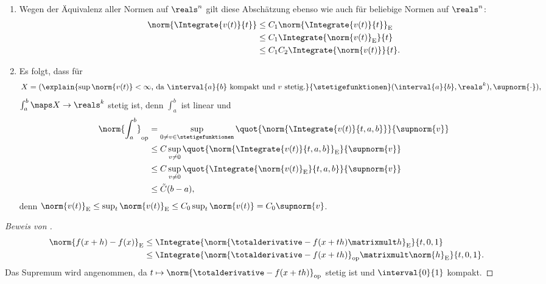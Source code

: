 \begin{bemerkungen*}
    \begin{enumerate}
        \item Wegen der Äquivalenz aller Normen auf \( \reals^n \) gilt diese Abschätzung ebenso wie  auch für beliebige Normen auf \( \reals^n \):
        \begin{equation*}
            \begin{split}
                \norm{\Integrate{v(t)}{t}}&\leq C_1\norm{\Integrate{v(t)}{t}}_{\text{E}}\\
                &\leq C_1\Integrate{\norm{v(t)}_{\text{E}}}{t}\\
                &\leq C_1 C_2 \Integrate{\norm{v(t)}}{t}.
            \end{split}
        \end{equation*}
        \item Es folgt, dass für
        \begin{equation*}
            X=(\explain{\sup\norm{v(t)}<\infty \text{, da \( \interval{a}{b} \) kompakt und \( v \) stetig.}}{\stetigefunktionen}(\interval{a}{b},\reals^k),\supnorm{\cdot}),
        \end{equation*}
        \( \int_a^b\maps X\to \reals^k \) stetig ist, denn \( \int_a^b \) ist linear und
        \begin{equation*}
            \begin{split}
                \norm{\int_a^b}_{\text{op}}&=\sup_{0\neq v \in \stetigefunktionen}\quot{\norm{\Integrate{v(t)}{t,a,b}}}{\supnorm{v}}\\
                &\leq C\sup_{v\neq 0}\quot{\norm{\Integrate{v(t)}{t,a,b}}_{\text{E}}}{\supnorm{v}}\\
                &\leq C\sup_{v\neq 0}\quot{\Integrate{\norm{v(t)}_{\text{E}}}{t,a,b}}{\supnorm{v}}\\
                &\leq \tilde{C}(b-a),
            \end{split}
        \end{equation*}
        denn \( \norm{v(t)}_{\text{E}}\leq \sup_{t}\norm{v(t)}_\text{E}\leq C_0\sup_t\norm{v(t)}=C_0\supnorm{v} \).
    \end{enumerate}
\end{bemerkungen*}
\begin{proof}[Beweis von ]
    \begin{equation*}
        \begin{split}
            \norm{f(x+h)-f(x)}_{\text{E}}&\leq \Integrate{\norm{\totalderivative-{f}(x+th)\matrixmult h}_{\text{E}}}{t,0,1}\\
            &\leq \Integrate{\norm{\totalderivative-{f}(x+th)}_{\text{op}}\matrixmult \norm{h}_{\text{E}}}{t,0,1}.
        \end{split}
    \end{equation*}
    Das Supremum wird angenommen, da \( t\mapsto \norm{\totalderivative-{f}(x+th)}_{\text{op}} \) stetig ist und \( \interval{0}{1} \) kompakt.
\end{proof}
